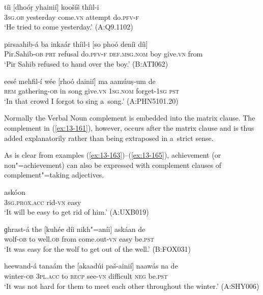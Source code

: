\begin{exe}
\ex
\label{ex:13-160}
\gll tíi [dhoóṛ yhainií] koošíš thíil-i \\
\textsc{3sg.ob} yesterday come.\textsc{vn} attempt do.\textsc{pfv-f} \\
\glt `He tried to come yesterday.' (A:Q9.1102)

\ex
\label{ex:13-161}
\gll pirsaahib-á ba inkaár thíil-i [so phoó  deníi díi] \\
Pir.Sahib-\textsc{ob} \textsc{prt} refusal do.\textsc{pfv-f} \textsc{def.msg.nom} boy  give.\textsc{vn} from \\
\glt `Pir Sahib refused to hand over the boy.' (B:ATI062)

\ex
\label{ex:13-162}
\gll eesé mehfil-í wée [rhoó dainií] ma  aamúuṣ-um de \\
\textsc{rem} gathering-\textsc{ob} in song give.\textsc{vn} \textsc{1sg.nom} forget-\textsc{1sg} \textsc{pst} \\
\glt `In that crowd I forgot to sing a~song.' (A:PHN5101.20) 
\end{exe}

Normally the Verbal Noun complement is embedded into the matrix clause. The complement in (\ref{ex:13-161}), however, occurs after the matrix clause and is thus added explanatorily rather than being extraposed in a~strict sense.


As is clear from examples (\ref{ex:13-163})--(\ref{ex:13-165}), achievement (or non"=achievement) can also be expressed with complement clauses of complement"=taking adjectives.

\begin{exe}
\ex
\label{ex:13-163}
\gll [nis phus"=ainií] askóon \\
\textsc{3sg.prox.acc} rid-\textsc{vn} easy \\
\glt `It will be easy to get rid of him.' (A:UXB019)

\ex
\label{ex:13-164}
\gll ɡhrast-á the [kuhée díi nikh"=aníi] askáan de  \\
wolf-\textsc{ob} to well.\textsc{ob} from come.out-\textsc{vn} easy be.\textsc{pst}  \\
\glt `It was easy for the wolf to get out of the well.' (B:FOX031)

\ex
\label{ex:13-165}
\gll heewand-á tanaám the [akaadúi paš-ainií] naawás  na de \\
winter-\textsc{ob} \textsc{3pl.acc} to \textsc{recp} see-\textsc{vn} difficult \textsc{neg} be.\textsc{pst} \\
\glt `It was not hard for them to meet each other throughout the winter.' (A:SHY006) 
\end{exe}

